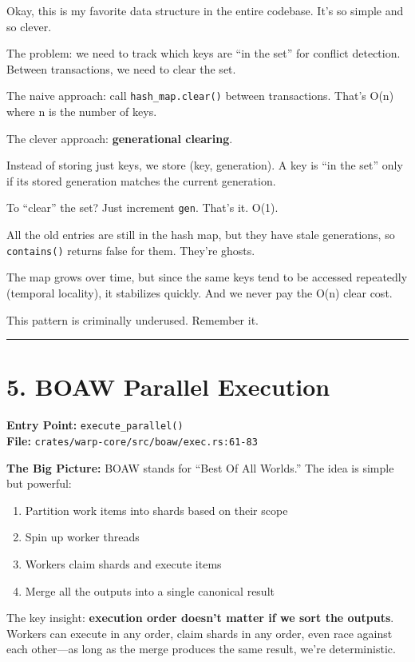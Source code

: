 \documentclass[11pt]{book}
\newenvironment{directors}
{\begin{mdframed}[
  linecolor=blue!60,
  linewidth=2pt,
  leftline=true,
  rightline=false,
  topline=false,
  bottomline=false,
  backgroundcolor=blue!3,
  innerleftmargin=12pt,
  innerrightmargin=10pt,
  innertopmargin=8pt,
  innerbottommargin=8pt,
  skipabove=12pt,
  skipbelow=12pt
]\small\sffamily\color{blue!70!black}}
{\end{mdframed}}
\newenvironment{bigpicture}
{\begin{mdframed}[
  linecolor=purple!60,
  linewidth=2pt,
  leftline=true,
  rightline=false,
  topline=false,
  bottomline=false,
  backgroundcolor=purple!3,
  innerleftmargin=12pt,
  innerrightmargin=10pt,
  innertopmargin=8pt,
  innerbottommargin=8pt,
  skipabove=12pt,
  skipbelow=12pt
]\small\sffamily\color{purple!70!black}\textbf{The Big Picture:} }
{\end{mdframed}}
\begin{document}
\begin{directors}
Okay, this is my favorite data structure in the entire codebase. It's so simple and so clever.

The problem: we need to track which keys are ``in the set'' for conflict detection. Between transactions, we need to clear the set.

The naive approach: call \texttt{hash\_map.clear()} between transactions. That's O(n) where n is the number of keys.

The clever approach: \textbf{generational clearing}.

Instead of storing just keys, we store (key, generation). A key is ``in the set'' only if its stored generation matches the current generation.

To ``clear'' the set? Just increment \texttt{gen}. That's it. O(1).

All the old entries are still in the hash map, but they have stale generations, so \texttt{contains()} returns false for them. They're ghosts.

The map grows over time, but since the same keys tend to be accessed repeatedly (temporal locality), it stabilizes quickly. And we never pay the O(n) clear cost.

This pattern is criminally underused. Remember it.
\end{directors}

\begin{center}\rule{0.5\linewidth}{0.5pt}\end{center}

\section{5. BOAW Parallel Execution}\label{boaw-parallel-execution}

\textbf{Entry Point:} \texttt{execute\_parallel()} \\
\textbf{File:} \texttt{crates/warp-core/src/boaw/exec.rs:61-83}

\begin{bigpicture}
BOAW stands for ``Best Of All Worlds.'' The idea is simple but powerful:

\begin{enumerate}
\item Partition work items into shards based on their scope
\item Spin up worker threads
\item Workers claim shards and execute items
\item Merge all the outputs into a single canonical result
\end{enumerate}

The key insight: \textbf{execution order doesn't matter if we sort the outputs}. Workers can execute in any order, claim shards in any order, even race against each other---as long as the merge produces the same result, we're deterministic.
\end{bigpicture}
\end{document}

